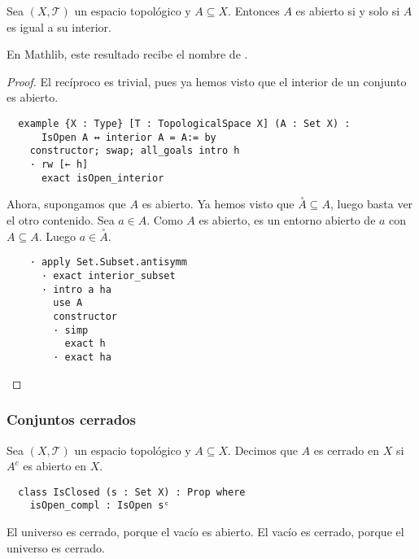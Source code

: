 \begin{proposition}
    Sea $(X, \mathcal{T})$ un espacio topológico y $A \subseteq X$. Entonces $A$ es abierto si y solo si $A$ es igual a su interior.
\end{proposition}

En Mathlib, este resultado recibe el nombre de .

\begin{proof}
  El recíproco es trivial, pues ya hemos visto que el interior de un conjunto es abierto.

  \begin{lstlisting}
  example {X : Type} [T : TopologicalSpace X] (A : Set X) :
      IsOpen A ↔ interior A = A:= by
    constructor; swap; all_goals intro h
    · rw [← h]
      exact isOpen_interior \end{lstlisting}

  Ahora, supongamos que $A$ es abierto. Ya hemos visto que $\overset{\circ}{A} \subseteq A$, luego basta ver el otro contenido. Sea $a \in A$. Como $A$ es abierto, es un entorno abierto de $a$ con $A \subseteq A$. Luego $a \in \overset{\circ}{A}$.
  
  \begin{lstlisting}
    · apply Set.Subset.antisymm
      · exact interior_subset
      · intro a ha
        use A
        constructor
        · simp
          exact h
        · exact ha \end{lstlisting}
\end{proof}


\subsubsection{Conjuntos cerrados}

\begin{definition}
  Sea $(X, \mathcal{T})$ un espacio topológico y $A \subseteq X$. Decimos que $A$ es \textnormal{cerrado} en $X$ si $A^c$ es abierto en $X$.
\end{definition}

\begin{lstlisting}
  class IsClosed (s : Set X) : Prop where
    isOpen_compl : IsOpen sᶜ
\end{lstlisting}

\begin{example}
  El universo es cerrado, porque el vacío es abierto. El vacío es cerrado, porque el universo es cerrado.
\end{example}

